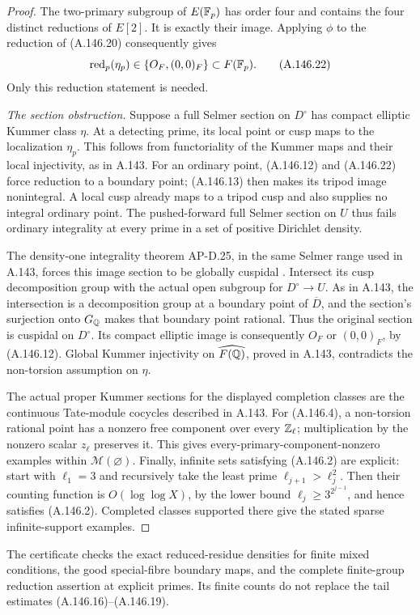\begin{proof}
The two-primary subgroup of \(E(\mathbb F_p)\) has order four
and contains the four distinct reductions of \(E[2]\).
It is exactly their image.  Applying \(\phi\) to the
reduction of (A.146.20) consequently gives
\[
                 \operatorname{red}_p(\eta_p)
                       \in\{O_F,(0,0)_F\}
                                  \subset F(\mathbb F_p).
\tag{A.146.22}
\]
Only this reduction statement is needed.

\emph{The section obstruction.}
Suppose a full Selmer section on \(D^\circ\) has compact
elliptic Kummer class \(\eta\).
At a detecting prime, its local point or cusp maps to the
localization \(\eta_p\).  This follows from functoriality of
the Kummer maps and their local injectivity, as in A.143.
For an ordinary point, (A.146.12) and (A.146.22) force
reduction to a boundary point; (A.146.13) then makes its
tripod image nonintegral.  A local cusp already maps to a
tripod cusp and also supplies no integral ordinary point.
The pushed-forward full Selmer section on \(U\) thus fails
ordinary integrality at every prime in a set of positive
Dirichlet density.

The density-one integrality theorem AP-D.25, in the same
Selmer range used in A.143, forces this image section to be
globally cuspidal \cite[D.25]{LegAP2026}.
Intersect its cusp decomposition group with the actual open
subgroup for \(D^\circ\to U\).  As in A.143, the
intersection is a decomposition group at a boundary point
of \(\overline D\), and the section's surjection onto
\(G_\mathbb Q\) makes that boundary point rational.
Thus the original section is cuspidal on \(D^\circ\).
Its compact elliptic image is consequently \(O_F\) or
\((0,0)_F\), by (A.146.12).
Global Kummer injectivity on \(\widehat{F(\mathbb Q)}\), proved
in A.143, contradicts the non-torsion assumption on \(\eta\).

The actual proper Kummer sections for the displayed completion
classes are the continuous Tate-module cocycles described in
A.143.  For (A.146.4), a non-torsion rational point has a
nonzero free component over every \(\mathbb Z_\ell\); multiplication
by the nonzero scalar \(z_\ell\) preserves it.
This gives every-primary-component-nonzero examples within
\(\mathcal M(\varnothing)\).
Finally, infinite sets satisfying (A.146.2) are explicit:
start with \(\ell_1=3\) and recursively take the least prime
\(\ell_{j+1}>\ell_j^2\).
Then their counting function is \(O(\log\log X)\), by the
lower bound \(\ell_j\ge3^{2^{j-1}}\), and hence satisfies
(A.146.2).  Completed classes supported there give the
stated sparse infinite-support examples.
\end{proof}

The certificate 
checks the exact reduced-residue densities for finite mixed
conditions, the good special-fibre boundary maps, and the
complete finite-group reduction assertion at explicit primes.
Its finite counts do not replace the tail estimates
(A.146.16)--(A.146.19).
